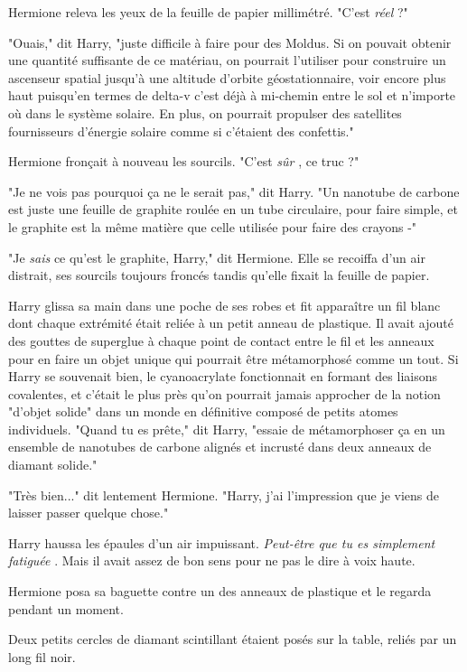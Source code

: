 Hermione releva les yeux de la feuille de papier millimétré. "C'est \emph{réel}  ?"

"Ouais," dit Harry, "juste difficile à faire pour des Moldus. Si on pouvait obtenir une quantité suffisante de ce matériau, on pourrait l'utiliser pour construire un ascenseur spatial jusqu'à une altitude d'orbite géostationnaire, voir encore plus haut puisqu'en termes de delta-v c'est déjà à mi-chemin entre le sol et n'importe où dans le système solaire. En plus, on pourrait propulser des satellites fournisseurs d'énergie solaire comme si c'étaient des confettis."

Hermione fronçait à nouveau les sourcils. "C'est \emph{sûr} , ce truc ?"

"Je ne vois pas pourquoi ça ne le serait pas," dit Harry. "Un nanotube de carbone est juste une feuille de graphite roulée en un tube circulaire, pour faire simple, et le graphite est la même matière que celle utilisée pour faire des crayons -"

"Je \emph{sais}  ce qu'est le graphite, Harry," dit Hermione. Elle se recoiffa d'un air distrait, ses sourcils toujours froncés tandis qu'elle fixait la feuille de papier.

Harry glissa sa main dans une poche de ses robes et fit apparaître un fil blanc dont chaque extrémité était reliée à un petit anneau de plastique. Il avait ajouté des gouttes de superglue à chaque point de contact entre le fil et les anneaux pour en faire un objet unique qui pourrait être métamorphosé comme un tout. Si Harry se souvenait bien, le cyanoacrylate fonctionnait en formant des liaisons covalentes, et c'était le plus près qu'on pourrait jamais approcher de la notion "d'objet solide" dans un monde en définitive composé de petits atomes individuels. "Quand tu es prête," dit Harry, "essaie de métamorphoser ça en un ensemble de nanotubes de carbone alignés et incrusté dans deux anneaux de diamant solide."

"Très bien..." dit lentement Hermione. "Harry, j'ai l'impression que je viens de laisser passer quelque chose."

Harry haussa les épaules d'un air impuissant. \emph{Peut-être que tu es simplement fatiguée} . Mais il avait assez de bon sens pour ne pas le dire à voix haute.

Hermione posa sa baguette contre un des anneaux de plastique et le regarda pendant un moment.

Deux petits cercles de diamant scintillant étaient posés sur la table, reliés par un long fil noir.

